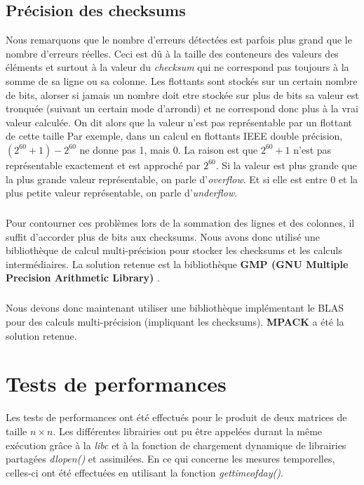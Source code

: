 \documentclass[a4paper, 10pt]{report}
\begin{document}
\section{Précision des checksums}
\label{sec:prec}
Nous remarquons que le nombre d'erreurs détectées est parfois plus grand que le nombre d'erreurs réelles.
Ceci est dû à la taille des conteneurs des valeurs des éléments et surtout à la valeur du \textit{checksum} qui ne
correspond pas toujours à la somme de sa ligne ou sa colonne. Les flottants sont stockés sur un certain nombre de bits, alorser
si jamais un nombre doit etre stockée sur plus de bits sa valeur est tronquée (suivant un certain mode d'arrondi) et ne correspond donc plus à la vrai
valeur calculée. On dit alors que la valeur n'est pas représentable par un flottant de cette taille\newline
Par exemple, dans un calcul en flottants IEEE double précision, $(2^{60}+1)-2^{60}$ ne donne pas 1, mais 0. La raison est que 
$2^{60}+1$ n'est pas représentable exactement et est approché par $2^{60}$.\newline
Si la valeur est plus grande que la plus grande valeur représentable, on parle d'\textit{overflow}.
Et si elle est entre 0 et la plus petite valeur représentable, on parle d'\textit{underflow}.
\paragraph*{}
Pour contourner ces problèmes lors de la sommation des lignes et des colonnes, il suffit d'accorder plus de bits aux checksums.
Nous avons donc utilisé une bibliothèque de calcul multi-précision pour stocker les checksums
et les calculs intermédiaires.
La solution retenue est la bibliothèque \textbf{GMP (GNU Multiple Precision Arithmetic Library)} \cite{GMP}.
\paragraph*{}
Nous devons donc maintenant utiliser une bibliothèque implémentant le BLAS pour des calculs multi-précision (impliquant les checksums).
\textbf{MPACK} \cite{MPACK} a été la solution retenue.

\chapter{Tests de performances}
\label{sec:benchmark}
Les tests de performances ont été effectués pour le produit de deux matrices de taille $n \times n$.\newline
Les différentes librairies ont pu \^etre appelées durant la m\^eme exécution gr\^ace à la \textit{libc} et à la fonction de chargement dynamique
de librairies partagées \textit{dlopen()} et assimilées.\newline
En ce qui concerne les mesures temporelles, celles-ci ont été effectuées en utilisant la fonction \textit{gettimeofday()}.
\end{document}
